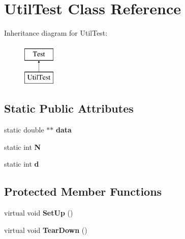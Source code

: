 \hypertarget{classUtilTest}{\section{Util\-Test Class Reference}
\label{classUtilTest}
}
Inheritance diagram for Util\-Test\-:\begin{figure}[H]
\begin{center}
\leavevmode
\includegraphics[height=2.000000cm]{classUtilTest}
\end{center}
\end{figure}
\subsection*{Static Public Attributes}
\begin{DoxyCompactItemize}
\item 
\hypertarget{classUtilTest_a13e27888113d6f5f4179c8dd88a39319}{static double $\ast$$\ast$ {\bfseries data}}\label{classUtilTest_a13e27888113d6f5f4179c8dd88a39319}

\item 
\hypertarget{classUtilTest_af0f842c0c1dcc77b49a38a00729bb1b5}{static int {\bfseries N}}\label{classUtilTest_af0f842c0c1dcc77b49a38a00729bb1b5}

\item 
\hypertarget{classUtilTest_a362326a74eb03fd9e035581901c6e103}{static int {\bfseries d}}\label{classUtilTest_a362326a74eb03fd9e035581901c6e103}

\end{DoxyCompactItemize}
\subsection*{Protected Member Functions}
\begin{DoxyCompactItemize}
\item 
\hypertarget{classUtilTest_a8f67bdc9dd37ff9fd862f66ddfb863cb}{virtual void {\bfseries Set\-Up} ()}\label{classUtilTest_a8f67bdc9dd37ff9fd862f66ddfb863cb}

\item 
\hypertarget{classUtilTest_a38fecea095d1c8f8bd55c86292425081}{virtual void {\bfseries Tear\-Down} ()}\label{classUtilTest_a38fecea095d1c8f8bd55c86292425081}

\end{DoxyCompactItemize}
